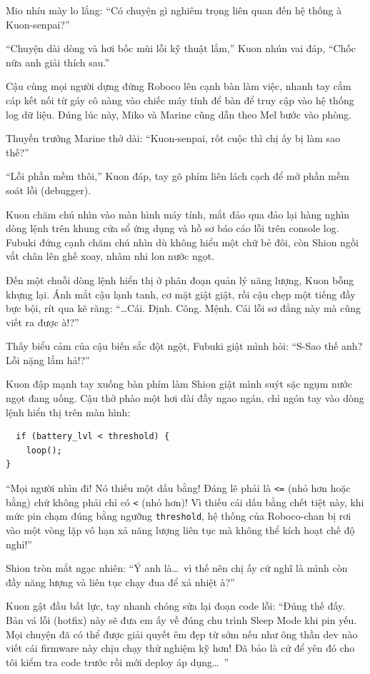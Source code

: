 \documentclass[../main.tex]{subfiles}
\begin{document}
Mio nhíu mày lo lắng: ``Có chuyện gì nghiêm trọng liên quan đến hệ thống à Kuon-senpai?''

``Chuyện dài dòng và hơi bốc mùi lỗi kỹ thuật lắm,'' Kuon nhún vai đáp, ``Chốc nữa anh giải thích sau.''

Cậu cùng mọi người dựng đứng Roboco lên cạnh bàn làm việc, nhanh tay cắm cáp kết nối từ gáy cô nàng vào chiếc máy tính để bàn để truy cập vào hệ thống log dữ liệu. Đúng lúc này, Miko và Marine cũng dẫn theo Mel bước vào phòng.

Thuyền trưởng Marine thở dài: ``Kuon-senpai, rốt cuộc thì chị ấy bị làm sao thế?''

``Lỗi phần mềm thôi,'' Kuon đáp, tay gõ phím liên lách cạch để mở phần mềm soát lỗi (debugger).

Kuon chăm chú nhìn vào màn hình máy tính, mắt đảo qua đảo lại hàng nghìn dòng lệnh trên khung cửa sổ ứng dụng và hồ sơ báo cáo lỗi trên console log. Fubuki đứng cạnh chăm chú nhìn dù không hiểu một chữ bẻ đôi, còn Shion ngồi vắt chân lên ghế xoay, nhâm nhi lon nước ngọt.

Đến một chuỗi dòng lệnh hiển thị ở phân đoạn quản lý năng lượng, Kuon bỗng khựng lại. Ánh mắt cậu lạnh tanh, cơ mặt giật giật, rồi cậu chẹp một tiếng đầy bực bội, rít qua kẽ răng: ``\dots Cái. Định. Công. Mệnh. Cái lỗi sơ đẳng này mà cũng viết ra được à!?''

Thấy biểu cảm của cậu biến sắc đột ngột, Fubuki giật mình hỏi: ``S-Sao thế anh? Lỗi nặng lắm hả!?''

Kuon đập mạnh tay xuống bàn phím làm Shion giật mình suýt sặc ngụm nước ngọt đang uống. Cậu thở phào một hơi dài đầy ngao ngán, chỉ ngón tay vào dòng lệnh hiển thị trên màn hình:

\begin{verbatim}
  if (battery_lvl < threshold) { 
    loop(); 
}
\end{verbatim}

``Mọi người nhìn đi! Nó thiếu một dấu bằng! Đáng lẽ phải là \texttt{<=} (nhỏ hơn hoặc bằng) chứ không phải chỉ có \texttt{<} (nhỏ hơn)! Vì thiếu cái dấu bằng chết tiệt này, khi mức pin chạm đúng bằng ngưỡng \texttt{threshold}, hệ thống của Roboco-chan bị rơi vào một vòng lặp vô hạn xả năng lượng liên tục mà không thể kích hoạt chế độ nghỉ!''

Shion tròn mắt ngạc nhiên: ``Ý anh là\dots\ vì thế nên chị ấy cứ nghĩ là mình còn đầy năng lượng và liên tục chạy đua để xả nhiệt à?''

Kuon gật đầu bất lực, tay nhanh chóng sửa lại đoạn code lỗi: ``Đúng thế đấy. Bản vá lỗi (hotfix) này sẽ đưa em ấy về đúng chu trình Sleep Mode khi pin yếu. Mọi chuyện đã có thể được giải quyết êm đẹp từ sớm nếu như ông thần dev nào viết cái firmware này chịu chạy thử nghiệm kỹ hơn! Đã bảo là cứ để yên đó cho tôi kiểm tra code trước rồi mới deploy áp dụng\dots\ ''
\end{document}
